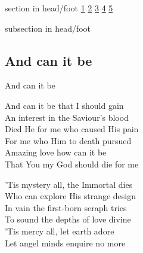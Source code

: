 \documentclass{beamer}
\begin{document}
{
{ 
 {
 \begin{beamercolorbox}[ht=4.5ex,dp=1.5ex,%
      leftskip=.3cm,rightskip=.3cm plus1fil]{section in head/foot}
 \fontsize{12}{25}\selectfont 
\hyperlink{And can it be[]1}{1}
\hyperlink{And can it be[]2}{2}
\hyperlink{And can it be[]3}{3}
\hyperlink{And can it be[]4}{4}
\hyperlink{And can it be[]5}{5}
 
 \end{beamercolorbox}%
  \begin{beamercolorbox}[ht=2.5ex,dp=1.125ex,%
   leftskip=.3cm,rightskip=.3cm plus1fil]{subsection in head/foot}
   \insertauthor
 \end{beamercolorbox}%
 }
}
\subsection{ And can it be }

\hypertarget{And can it be[]1}{}
\begin{frame}{And can it be }
\fontsize{ 18 }{ 23 }\selectfont

And can it be that I should gain\\ 
An interest in the Saviour's blood\\ 
Died He for me who caused His pain\\ 
For me who Him to death pursued\\ 
Amazing love how can it be\\ 
That You my God should die for me 

\end{frame}

\hypertarget{And can it be[]2}{}
\begin{frame}{}
\fontsize{ 18 }{ 23 }\selectfont

'Tis mystery all, the Immortal dies\\ 
Who can explore His strange design\\ 
In vain the first-born seraph tries\\ 
To sound the depths of love divine\\ 
'Tis mercy all, let earth adore\\ 
Let angel minds enquire no more 

\end{frame}

\hypertarget{And can it be[]3}{}
\begin{frame}{}
\fontsize{ 18 }{ 23 }\selectfont


\end{frame}}
\end{document}
